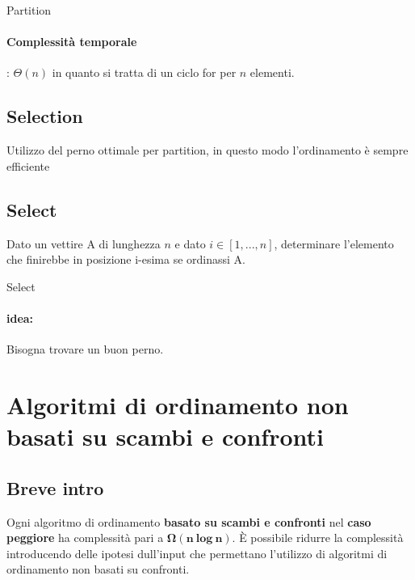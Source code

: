\documentclass{article}
\begin{document}
\begin{algorithm}[H]
\caption{Partition}
\end{algorithm}

\paragraph{Complessità temporale}: $\Theta(n)$ in quanto si tratta di un ciclo for per $n$ elementi.

\hypertarget{selection}{}\subsection{Selection} %
Utilizzo del perno ottimale per partition, in questo modo l'ordinamento è sempre efficiente


\hypertarget{select}{}\subsection{Select} %
Dato un vettire A di lunghezza $n$ e dato $i \in [1,...,n]$, determinare l'elemento che finirebbe in posizione i-esima se ordinassi A. 

\begin{algorithm}[H]
\caption{Select}
\end{algorithm}
\paragraph{idea:} Bisogna trovare un buon perno.

\section{Algoritmi di ordinamento non basati su scambi e confronti}

\subsection{Breve intro}
Ogni algoritmo di ordinamento \textbf{basato su scambi e confronti} nel \textbf{caso peggiore} ha complessità pari a $\mathbf{\Omega(n \ log \ n)}$. 
È possibile ridurre la complessità introducendo delle ipotesi dull'input che permettano l'utilizzo di algoritmi di ordinamento non basati su confronti.
\end{document}
